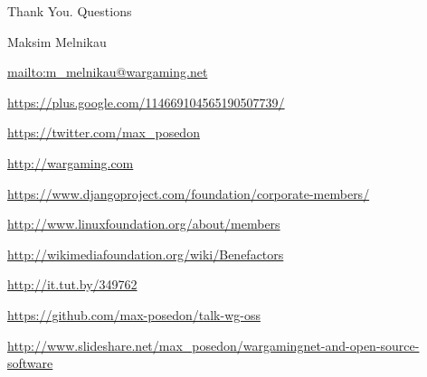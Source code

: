 \documentclass[aspectratio=169]{beamer}
\begin{document}
{


\begin{frame}{Thank You. Questions}
    \begin{block}{Maksim Melnikau}
    \par \url{mailto:m\_melnikau@wargaming.net}
    \par \url{https://plus.google.com/114669104565190507739/}
    \par \url{https://twitter.com/max\_posedon}
    \par \url{http://wargaming.com}
    \par \url{https://www.djangoproject.com/foundation/corporate-members/}
    \par \url{http://www.linuxfoundation.org/about/members}
    \par \url{http://wikimediafoundation.org/wiki/Benefactors}
    \par \url{http://it.tut.by/349762}
    \par \url{https://github.com/max-posedon/talk-wg-oss}
    \par \url{http://www.slideshare.net/max\_posedon/wargamingnet-and-open-source-software}
    \end{block}
\end{frame}
}
\end{document}
